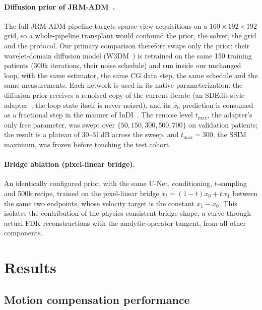\documentclass[11pt]{article}
\begin{document}
\paragraph{Diffusion prior of JRM-ADM~\cite{depaepe25}.}
The full JRM-ADM pipeline targets sparse-view acquisitions on a $160\times192\times192$ grid,
so a whole-pipeline transplant would confound the prior, the solver, the grid and the
protocol. Our primary comparison therefore swaps only the prior: their wavelet-domain
diffusion model (W3DM~\cite{wdm24}) is retrained on the same 150 training patients (300k
iterations, their noise schedule) and run inside our unchanged loop, with the same estimator,
the same CG data step, the same schedule and the same measurements. Each network is used in
its native parameterization: the diffusion prior receives a renoised copy of the current
iterate (an SDEdit-style adapter~\cite{sdedit22}; the loop state itself is never noised), and
its $\hat x_0$ prediction is consumed as a fractional step in the manner of
InDI~\cite{indi23}. The renoise level $t_{\max}$, the adapter's only free parameter, was
swept over $\{50,150,300,500,700\}$ on validation patients; the result is a plateau of
30--31\,dB across the sweep, and $t_{\max}{=}300$, the SSIM maximum, was frozen before
touching the test cohort.

\paragraph{Bridge ablation (pixel-linear bridge).}
An identically configured prior, with the same U-Net, conditioning, $t$-sampling and 500k
recipe, trained on the pixel-linear bridge $x_t = (1-t)x_0 + t\,x_1$ between the same two
endpoints, whose velocity target is the constant $x_1 - x_0$. This isolates the contribution
of the physics-consistent bridge shape, a curve through actual FDK reconstructions with the
analytic operator tangent, from all other components.

\section{Results}
\label{sec:results}

\subsection{Motion compensation performance}
\label{sec:results-main}
\end{document}
